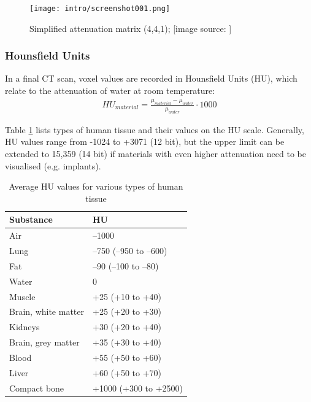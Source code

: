 \begin{figure}[!htb]
	\centering
	\texttt{[image: intro/screenshot001.png]}
	\caption{Simplified attenuation matrix (4,4,1); [image source: \cite{Maidment2014}]}
	\label{fig:voxel_matrix}
\end{figure}

\subsubsection{Hounsfield Units}

In a final CT scan, voxel values are recorded in Hounsfield Units (HU), which relate to the attenuation of water at room temperature:
\begin{align}
HU_{material} = \frac{\mu_{material} - \mu_{water}}{\mu_{water}} \cdot 1000
\end{align}

Table \ref{tab:HU} lists types of human tissue and their values on the HU scale.
Generally, HU values range from -1024 to +3071 (12 bit), but the upper limit can be extended to 15,359 (14 bit) if materials with even higher attenuation need to be visualised (e.g. implants). \\

\begin{table}[]
	\centering
	\caption{Average HU values for various types of human tissue}
	\label{tab:HU}
	\begin{tabular}{@{}ll@{}}
		\toprule
		Substance           & HU                     \\ \midrule
		Air                 & –1000                  \\
		Lung                & –750 (–950 to –600)    \\
		Fat                 & –90 (–100 to –80)      \\
		Water               & 0                      \\
		Muscle              & +25 (+10 to +40)       \\
		Brain, white matter & +25 (+20 to +30)       \\
		Kidneys             & +30 (+20 to +40)       \\
		Brain, grey matter  & +35 (+30 to +40)       \\
		Blood               & +55 (+50 to +60)       \\
		Liver               & +60 (+50 to +70)       \\
		Compact bone        & +1000 (+300 to +2500)  \\ \bottomrule
	\end{tabular}
\end{table}

